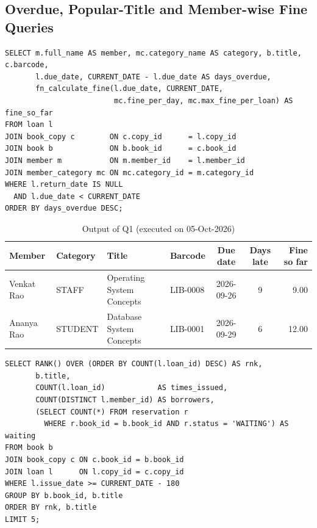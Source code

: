 \documentclass[11pt,a4paper]{report}
\begin{document}
\subsection{Overdue, Popular-Title and Member-wise Fine Queries}
\label{sec:queries}
\begin{lstlisting}[caption={Q1 -- Overdue books with the fine accrued so far}, label={lst:q1}]
SELECT m.full_name AS member, mc.category_name AS category, b.title, c.barcode,
       l.due_date, CURRENT_DATE - l.due_date AS days_overdue,
       fn_calculate_fine(l.due_date, CURRENT_DATE,
                         mc.fine_per_day, mc.max_fine_per_loan) AS fine_so_far
FROM loan l
JOIN book_copy c        ON c.copy_id      = l.copy_id
JOIN book b             ON b.book_id      = c.book_id
JOIN member m           ON m.member_id    = l.member_id
JOIN member_category mc ON mc.category_id = m.category_id
WHERE l.return_date IS NULL
  AND l.due_date < CURRENT_DATE
ORDER BY days_overdue DESC;
\end{lstlisting}

\begin{table}[H]
    \centering
    \caption{Output of Q1 (executed on 05-Oct-2026)}
    \scriptsize
    \begin{tabular}{|l|l|l|l|c|c|r|}
        \hline
        \textbf{Member} & \textbf{Category} & \textbf{Title} & \textbf{Barcode} & \textbf{Due date} & \textbf{Days late} & \textbf{Fine so far} \\ \hline
        Venkat Rao & STAFF & Operating System Concepts & LIB-0008 & 2026-09-26 & 9 & 9.00 \\ \hline
        Ananya Rao & STUDENT & Database System Concepts & LIB-0001 & 2026-09-29 & 6 & 12.00 \\ \hline
    \end{tabular}
\end{table}

\begin{lstlisting}[caption={Q2 -- Most popular titles in the last 180 days}, label={lst:q2}]
SELECT RANK() OVER (ORDER BY COUNT(l.loan_id) DESC) AS rnk,
       b.title,
       COUNT(l.loan_id)            AS times_issued,
       COUNT(DISTINCT l.member_id) AS borrowers,
       (SELECT COUNT(*) FROM reservation r
         WHERE r.book_id = b.book_id AND r.status = 'WAITING') AS waiting
FROM book b
JOIN book_copy c ON c.book_id = b.book_id
JOIN loan l      ON l.copy_id = c.copy_id
WHERE l.issue_date >= CURRENT_DATE - 180
GROUP BY b.book_id, b.title
ORDER BY rnk, b.title
LIMIT 5;
\end{lstlisting}
\end{document}
